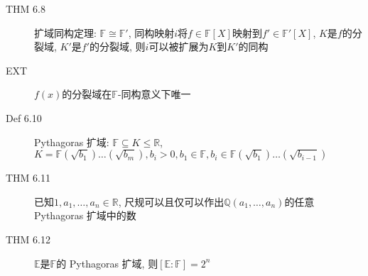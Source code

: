 \documentclass{article}
\begin{document}
\begin{description}
        \item[THM 6.8] 扩域同构定理: $\mathbb F \cong \mathbb F'$, 同构映射$i$将$f \in \mathbb F[X]$映射到$f' \in \mathbb F'[X]$, $K$是$f$的分裂域, $K'$是$f'$的分裂域, 则$i$可以被扩展为$K$到$K'$的同构
        \item[EXT] $f(x)$的分裂域在$\mathbb F$-同构意义下唯一
        \item[Def 6.10] Pythagoras 扩域: $\mathbb F \subseteq K \le \mathbb R$, $K = \mathbb F(\sqrt{b_1})\dots(\sqrt{b_m}), b_i > 0, b_1 \in \mathbb F, b_i \in \mathbb F(\sqrt{b_1})\dots(\sqrt{b_{i-1}})$\\
        \item[THM 6.11] 已知$1, a_1, \dots, a_n \in \mathbb R$, 尺规可以且仅可以作出$\mathbb Q(a_1, \dots, a_n)$的任意 Pythagoras 扩域中的数
        \item[THM 6.12] $\mathbb E$是$\mathbb F$的 Pythagoras 扩域, 则$[\mathbb E:\mathbb F] = 2^n$
    \end{description}
\end{document}
